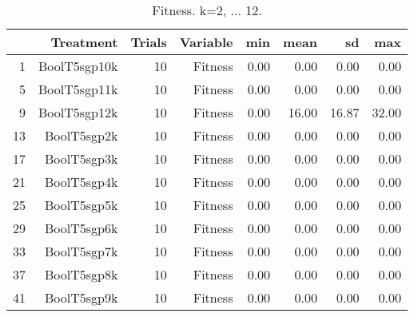 \begin{table}[ht]
\centering
\begin{tabular}{rrrrrrrr}
  \hline
 & Treatment & Trials & Variable & min & mean & sd & max \\ 
  \hline
1 & BoolT5sgp10k &  10 & Fitness & 0.00 & 0.00 & 0.00 & 0.00 \\ 
  5 & BoolT5sgp11k &  10 & Fitness & 0.00 & 0.00 & 0.00 & 0.00 \\ 
  9 & BoolT5sgp12k &  10 & Fitness & 0.00 & 16.00 & 16.87 & 32.00 \\ 
  13 & BoolT5sgp2k &  10 & Fitness & 0.00 & 0.00 & 0.00 & 0.00 \\ 
  17 & BoolT5sgp3k &  10 & Fitness & 0.00 & 0.00 & 0.00 & 0.00 \\ 
  21 & BoolT5sgp4k &  10 & Fitness & 0.00 & 0.00 & 0.00 & 0.00 \\ 
  25 & BoolT5sgp5k &  10 & Fitness & 0.00 & 0.00 & 0.00 & 0.00 \\ 
  29 & BoolT5sgp6k &  10 & Fitness & 0.00 & 0.00 & 0.00 & 0.00 \\ 
  33 & BoolT5sgp7k &  10 & Fitness & 0.00 & 0.00 & 0.00 & 0.00 \\ 
  37 & BoolT5sgp8k &  10 & Fitness & 0.00 & 0.00 & 0.00 & 0.00 \\ 
  41 & BoolT5sgp9k &  10 & Fitness & 0.00 & 0.00 & 0.00 & 0.00 \\ 
   \hline
\end{tabular}
\caption{Fitness. k=2, ... 12.} 
\end{table}
